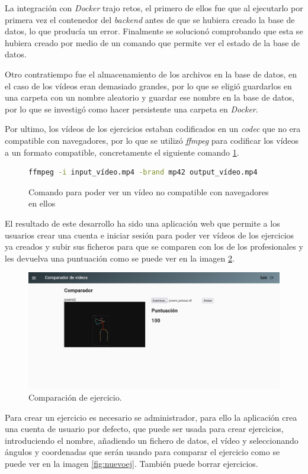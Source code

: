 La integración con \textit{Docker} trajo retos, el primero de ellos fue que al ejecutarlo por primera vez el contenedor del \textit{backend} antes de que se hubiera creado la base de datos, lo que producía un error. Finalmente se solucionó comprobando que esta se hubiera creado por medio de un comando que permite ver el estado de la base de datos. 

Otro contratiempo fue el almacenamiento de los archivos en la base de datos, en el caso de los vídeos eran demasiado grandes, por lo que  se eligió guardarlos en una carpeta con un nombre aleatorio y guardar ese nombre en la base de datos, por lo que se investigó como hacer persistente una carpeta en \textit{Docker}.

Por ultimo, los vídeos de los ejercicios estaban codificados en un \textit{codec} que no era compatible con navegadores, por lo que se utilizó \textit{ffmpeg} para codificar los vídeos a un formato compatible, concretamente el siguiente comando \ref{ffmpeg}.

\begin{figure}
\begin{lstlisting}[language=Bash]
	ffmpeg -i input_vídeo.mp4 -brand mp42 output_vídeo.mp4
\end{lstlisting}
\caption{Comando para poder ver un vídeo no compatible con navegadores en ellos}
\label{ffmpeg}
\end{figure}

El resultado de este desarrollo ha sido una aplicación web que permite a los usuarios crear una cuenta e iniciar sesión para poder ver vídeos de los ejercicios ya creados y subir sus ficheros para que se comparen con los de los profesionales y les devuelva una puntuación como se puede ver en la imagen \ref{fig:compararej}.

\begin{figure}
	\centering
	\includegraphics[width=0.7\linewidth]{img/comparar_ej}
	\caption{Comparación de ejercicio.}
	\label{fig:compararej}
\end{figure}


Para crear un ejercicio es necesario se administrador, para ello la aplicación crea una cuenta de usuario por defecto, que puede ser usada para crear ejercicios, introduciendo el nombre, añadiendo un fichero de datos, el vídeo y seleccionando ángulos y coordenadas que serán usando para comparar el ejercicio como se puede ver en la imagen \ref{fig:nuevoej}. También puede borrar ejercicios.

